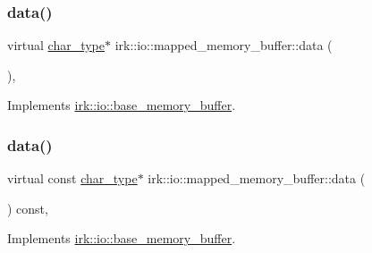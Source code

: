 \subsubsection{\texorpdfstring{data()}{data()}\hspace{0.1cm}{\footnotesize\ttfamily [1/2]}}
{\footnotesize\ttfamily virtual \mbox{\hyperlink{classirk_1_1io_1_1base__memory__buffer_a1b539180df4274dd4ad0402a0ac821ec}{char\+\_\+type}}$\ast$ irk\+::io\+::mapped\+\_\+memory\+\_\+buffer\+::data (\begin{DoxyParamCaption}{ }\end{DoxyParamCaption})\hspace{0.3cm}{\ttfamily [inline]}, {\ttfamily [virtual]}}



Implements \mbox{\hyperlink{classirk_1_1io_1_1base__memory__buffer_ae8247b83aae579cbc04b5432bd4858cc}{irk\+::io\+::base\+\_\+memory\+\_\+buffer}}.

\mbox{\label{classirk_1_1io_1_1mapped__memory__buffer_ab4bbb25488358a3d527d45d16a845fb6}} 
\subsubsection{\texorpdfstring{data()}{data()}\hspace{0.1cm}{\footnotesize\ttfamily [2/2]}}
{\footnotesize\ttfamily virtual const \mbox{\hyperlink{classirk_1_1io_1_1base__memory__buffer_a1b539180df4274dd4ad0402a0ac821ec}{char\+\_\+type}}$\ast$ irk\+::io\+::mapped\+\_\+memory\+\_\+buffer\+::data (\begin{DoxyParamCaption}{ }\end{DoxyParamCaption}) const\hspace{0.3cm}{\ttfamily [inline]}, {\ttfamily [virtual]}}



Implements \mbox{\hyperlink{classirk_1_1io_1_1base__memory__buffer_a87bbff1a6d211e26f0c0aa924a980b9e}{irk\+::io\+::base\+\_\+memory\+\_\+buffer}}.

\mbox{\label{classirk_1_1io_1_1mapped__memory__buffer_ae64bb8d5018d83bd9feb605704bb0c82}} 
